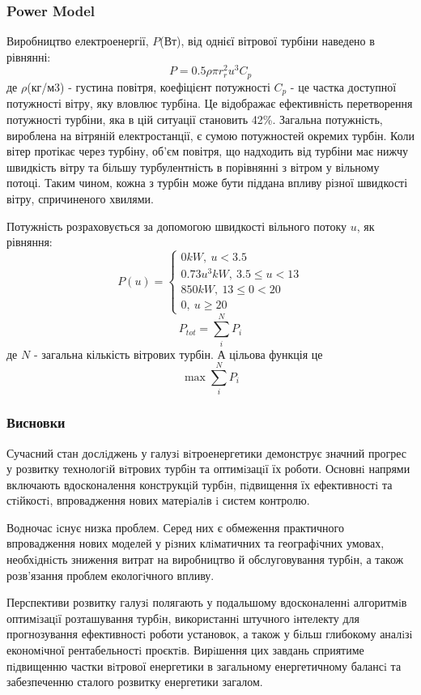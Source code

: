 \documentclass{beamer}
\begin{document}
    \begin{frame}
        \frametitle{Power Model}
        Виробництво електроенергії, $P$(Вт), від однієї вітрової турбіни наведено в рівнянні:
        $$P=0.5\rho\pi r_r^2u^3C_p$$
        де $\rho$(кг/м3) - густина повітря, коефіцієнт потужності $C_p$ - це частка доступної потужності вітру, яку вловлює турбіна. 
        Це відображає ефективність перетворення потужності турбіни, яка в цій ситуації становить 42\%. Загальна потужність, вироблена на вітряній електростанції, 
        є сумою потужностей окремих турбін. Коли вітер протікає через турбіну, об’єм повітря, що надходить від турбіни має нижчу швидкість вітру та більшу турбулентність
        в порівнянні з вітром у вільному потоці. Таким чином, кожна з турбін може бути піддана впливу різної швидкості вітру, спричиненого хвилями.
    \end{frame}

    \begin{frame}
        Потужність розраховується за допомогою швидкості вільного потоку $u$, як рівняння:
        $$P(u)=
            \begin{cases} 
            0kW,\: u<3.5\\
            0.73u^3kW,\: 3.5\leqslant u<13 \\
            850kW,\: 13\leqslant 0<20 \\
            0,\: u\geqslant 20
            \end{cases}$$
        $$P_{tot}=\sum\limits^{N}_{i}P_i$$
        де $N$ - загальна кількість вітрових турбін. А цільова функція це
        $$\max\sum\limits^{N}_{i}P_i$$        
    \end{frame}

    \begin{frame}
        \frametitle{Висновки}
        Сучасний стан дослiджень у галузi вiтроенергетики демонструє значний прогрес у розвитку технологiй вiтрових турбiн та оптимiзацiї їх роботи. Основнi напрями включають
        вдосконалення конструкцiй турбiн, пiдвищення їх ефективностi та стiйкостi, впровадження нових матерiалiв i систем контролю.

        Водночас iснує низка проблем. Серед них є обмеження практичного впровадження
        нових моделей у рiзних клiматичних та географiчних умовах, необхiднiсть зниження витрат на виробництво й обслуговування турбiн, а також розв’язання проблем екологiчного впливу.

        Перспективи розвитку галузi полягають у подальшому вдосконаленнi алгоритмiв оптимiзацiї розташування турбiн, використаннi штучного iнтелекту для прогнозування ефективностi роботи установок, а також у бiльш глибокому аналiзi економiчної рентабельностi
        проєктiв. Вирiшення цих завдань сприятиме пiдвищенню частки вiтрової енергетики в
        загальному енергетичному балансi та забезпеченню сталого розвитку енергетики загалом.
    \end{frame}
\end{document}
